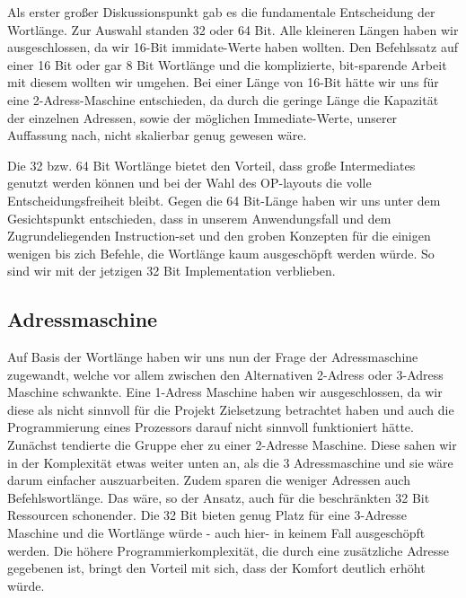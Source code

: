 \documentclass[paper=a4,fontsize=12pt,twocolumn]{scrreprt}
\begin{document}
Als erster großer Diskussionspunkt gab es die fundamentale Entscheidung der Wortlänge.
Zur Auswahl standen 32 oder 64 Bit. Alle kleineren Längen haben wir ausgeschlossen, da wir 16-Bit immidate-Werte haben wollten.
Den Befehlssatz auf einer 16 Bit oder gar 8 Bit Wortlänge und die komplizierte, bit-sparende Arbeit mit diesem wollten wir umgehen.
Bei einer Länge von 16-Bit hätte wir uns für eine 2-Adress-Maschine entschieden, da durch die geringe Länge die Kapazität der einzelnen Adressen, sowie der möglichen Immediate-Werte, unserer Auffassung nach, nicht skalierbar genug gewesen wäre. %

Die 32 bzw. 64 Bit Wortlänge bietet den Vorteil, dass große Intermediates genutzt werden können und bei der Wahl des OP-layouts die volle Entscheidungsfreiheit bleibt.
Gegen die 64 Bit-Länge haben wir uns unter dem Gesichtspunkt entschieden, dass in unserem Anwendungsfall und dem Zugrundeliegenden Instruction-set und den groben Konzepten für die einigen wenigen bis zich Befehle, die Wortlänge kaum ausgeschöpft werden würde. %
So sind wir mit der jetzigen 32 Bit Implementation verblieben.


\subsection{Adressmaschine}
Auf Basis der Wortlänge haben wir uns nun der Frage der Adressmaschine zugewandt, welche vor allem zwischen den Alternativen 2-Adress oder 3-Adress Maschine schwankte.
Eine 1-Adress Maschine haben wir ausgeschlossen, da wir diese als nicht sinnvoll für die Projekt Zielsetzung betrachtet haben und auch die Programmierung eines Prozessors darauf nicht sinnvoll funktioniert hätte. %
Zunächst tendierte die Gruppe eher zu einer 2-Adresse Maschine.
Diese sahen wir in der Komplexität etwas weiter unten an, als die 3 Adressmaschine und sie wäre darum einfacher auszuarbeiten.
Zudem sparen die weniger Adressen auch Befehlswortlänge.
Das wäre, so der Ansatz, auch für die beschränkten 32 Bit Ressourcen schonender.
Die 32 Bit bieten genug Platz für eine 3-Adresse Maschine und die Wortlänge würde - auch hier- in keinem Fall ausgeschöpft werden.
Die höhere Programmierkomplexität, die durch eine zusätzliche Adresse gegebenen ist, bringt den Vorteil mit sich, dass der Komfort deutlich erhöht würde.
\end{document}

